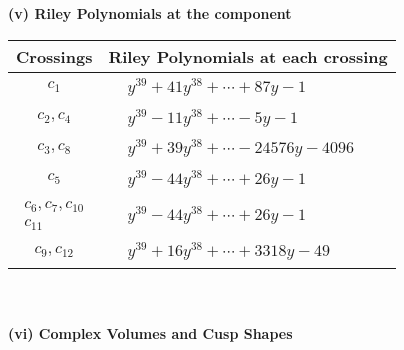 \documentclass[1p]{elsarticle_modified}
\theoremstyle{definition}
\begin{document}
\newpage\renewcommand{\arraystretch}{1}
\flushleft \textbf{(v) Riley Polynomials at the component}\newline \\
\begin{tabular}{m{50pt}|m{274pt}}
Crossings & \hspace{64pt}Riley Polynomials at each crossing \\
\hline $$\begin{aligned}c_{1}\end{aligned}$$&$\begin{aligned}
&y^{39}+41 y^{38}+\cdots+87 y-1
\end{aligned}$\\
\hline $$\begin{aligned}c_{2},c_{4}\end{aligned}$$&$\begin{aligned}
&y^{39}-11 y^{38}+\cdots-5 y-1
\end{aligned}$\\
\hline $$\begin{aligned}c_{3},c_{8}\end{aligned}$$&$\begin{aligned}
&y^{39}+39 y^{38}+\cdots-24576 y-4096
\end{aligned}$\\
\hline $$\begin{aligned}c_{5}\end{aligned}$$&$\begin{aligned}
&y^{39}-44 y^{38}+\cdots+26 y-1
\end{aligned}$\\
\hline $$\begin{aligned}c_{6},c_{7},c_{10}\\c_{11}\end{aligned}$$&$\begin{aligned}
&y^{39}-44 y^{38}+\cdots+26 y-1
\end{aligned}$\\
\hline $$\begin{aligned}c_{9},c_{12}\end{aligned}$$&$\begin{aligned}
&y^{39}+16 y^{38}+\cdots+3318 y-49
\end{aligned}$\\
\hline
\end{tabular}\\~\\
\newpage\flushleft \textbf{(vi) Complex Volumes and Cusp Shapes}
\end{document}
